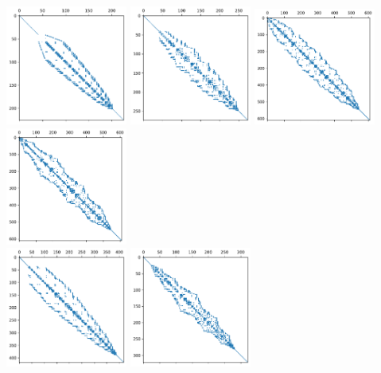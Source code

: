 \documentclass[a4paper]{article}
\begin{document}
\begin{center}
\includegraphics[width=4cm]{../results/spy/A_aft_topo0.pdf}
\includegraphics[width=4cm]{../results/spy/A_aft_topo1.pdf}
\includegraphics[width=4cm]{../results/spy/A_aft_topo2.pdf}
\includegraphics[width=4cm]{../results/spy/A_aft_topo3.pdf}\\
\includegraphics[width=4cm]{../results/spy/A_aft_topo4.pdf}
\includegraphics[width=4cm]{../results/spy/A_aft_topo5.pdf}

\end{center}
\end{document}
